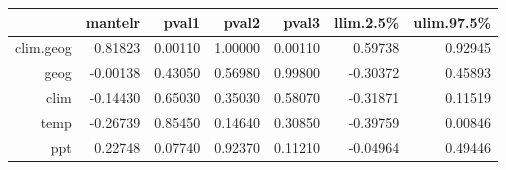 \begin{table}[ht]
\centering
\begin{tabular}{rrrrrrr}
  \hline
 & mantelr & pval1 & pval2 & pval3 & llim.2.5\% & ulim.97.5\% \\ 
  \hline
clim.geog & 0.81823 & 0.00110 & 1.00000 & 0.00110 & 0.59738 & 0.92945 \\ 
  geog & -0.00138 & 0.43050 & 0.56980 & 0.99800 & -0.30372 & 0.45893 \\ 
  clim & -0.14430 & 0.65030 & 0.35030 & 0.58070 & -0.31871 & 0.11519 \\ 
  temp & -0.26739 & 0.85450 & 0.14640 & 0.30850 & -0.39759 & 0.00846 \\ 
  ppt & 0.22748 & 0.07740 & 0.92370 & 0.11210 & -0.04964 & 0.49446 \\ 
   \hline
\end{tabular}
\end{table}
